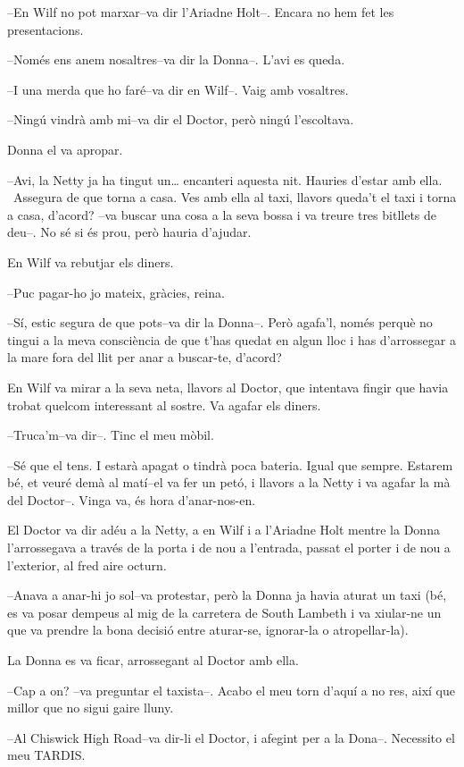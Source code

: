 --En Wilf no pot marxar--va dir l'Ariadne Holt--. Encara no hem fet les
presentacions.

--Només ens anem nosaltres--va dir la Donna--. L'avi es queda.

--I una merda que ho faré--va dir en Wilf--. Vaig amb vosaltres.

--Ningú vindrà amb mi--va dir el Doctor, però ningú l'escoltava.

Donna el va apropar.

--Avi, la Netty ja ha tingut un\ldots{} encanteri aquesta nit. Hauries
d'estar amb ella. ~Assegura de que torna a casa. Ves amb ella al taxi,
llavors queda't el taxi i torna a casa, d'acord? --va buscar una cosa a
la seva bossa i va treure tres bitllets de deu--. No sé si és prou, però
hauria d'ajudar.

En Wilf va rebutjar els diners.

--Puc pagar-ho jo mateix, gràcies, reina.

--Sí, estic segura de que pots--va dir la Donna--. Però agafa'l, només
perquè no tingui a la meva consciència de que t'has quedat en algun lloc
i has d'arrossegar a la mare fora del llit per anar a buscar-te,
d'acord?

En Wilf va mirar a la seva neta, llavors al Doctor, que intentava fingir
que havia trobat quelcom interessant al sostre. Va agafar els diners.

--Truca'm--va dir--. Tinc el meu mòbil.

--Sé que el tens. I estarà apagat o tindrà poca bateria. Igual que
sempre. Estarem bé, et veuré demà al matí--el va fer un petó, i llavors
a la Netty i va agafar la mà del Doctor--. Vinga va, és hora
d'anar-nos-en.

El Doctor va dir adéu a la Netty, a en Wilf i a l'Ariadne Holt mentre la
Donna l'arrossegava a través de la porta i de nou a l'entrada, passat el
porter i de nou a l'exterior, al fred aire octurn.

--Anava a anar-hi jo sol--va protestar, però la Donna ja havia aturat un
taxi (bé, es va posar dempeus al mig de la carretera de South Lambeth i
va xiular-ne un que va prendre la bona decisió entre aturar-se,
ignorar-la o atropellar-la).

La Donna es va ficar, arrossegant al Doctor amb ella.

--Cap a on? --va preguntar el taxista--. Acabo el meu torn d'aquí a no
res, així que millor que no sigui gaire lluny.

--Al Chiswick High Road--va dir-li el Doctor, i afegint per a la Dona--.
Necessito el meu TARDIS.

